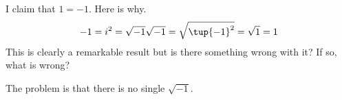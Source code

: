 \begin{enumialphparenastyle}
\begin{ex} I claim that $1=-1.$ Here is why.
\begin{equation*}
-1=i^{2}=\sqrt{-1}\sqrt{-1}=\sqrt{\tup{-1} ^{2}}=\sqrt{1}=1
\end{equation*}
This is clearly a remarkable result but is there something wrong with it? If
so, what is wrong? 
\begin{sol}
The problem is that there is no single $\sqrt{-1}$.
\end{sol}
\end{ex}

\end{enumialphparenastyle}
